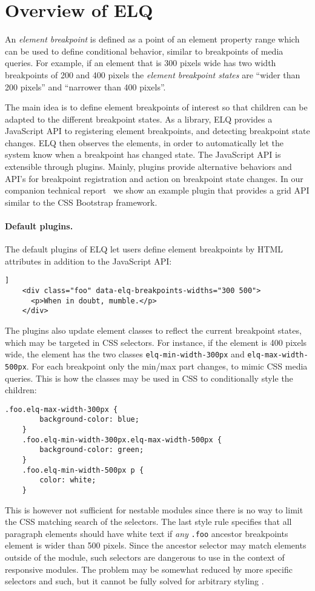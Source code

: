 \documentclass[sigconf,9pt]{acmart}
\newcommand{\elq}{ELQ}
\newcommand{\code}[1]{\texttt{#1}}
\begin{document}
\section{Overview of \elq{}}\label{sec:elq}\label{sec:elq-api}
  An \emph{element breakpoint} is defined as a point of an element
  property range which can be used to define conditional behavior,
  similar to breakpoints of media queries.  For example, if an element
  that is 300 pixels wide has two width breakpoints of 200 and 400
  pixels the {\em element breakpoint states} are ``wider than 200
  pixels'' and ``narrower than 400 pixels''.

  The main idea is to define element breakpoints of interest so that children can be adapted to the different breakpoint states.
  As a library, \elq{} provides a JavaScript API to registering element breakpoints, and detecting breakpoint state changes.
  \elq{} then observes the elements, in order to automatically let the system know when a breakpoint has changed state.
  The JavaScript API is extensible through plugins.
  Mainly, plugins provide alternative behaviors and API's for breakpoint registration and action on breakpoint state changes.
  In our companion technical report~\cite{WienerEH15} we show an example plugin that provides a grid API similar to the CSS Bootstrap framework.

  \paragraph{Default plugins.}
  The default plugins of \elq{} let users define element breakpoints by HTML attributes in addition to the JavaScript API:
  \begin{lstlisting}[gobble=4,caption={},captionpos=b,label={}]]
    <div class="foo" data-elq-breakpoints-widths="300 500">
      <p>When in doubt, mumble.</p>
    </div>
  \end{lstlisting}
  The plugins also update element classes to reflect the current breakpoint states, which may be targeted in CSS selectors.
  For instance, if the element is 400 pixels wide, the element has the two classes \code{elq-min-width-300px} and \code{elq-max-width-500px}.
  For each breakpoint only the min/max part changes, to mimic CSS media queries.
  This is how the classes may be used in CSS to conditionally style the children:
  \begin{lstlisting}[gobble=4]
    .foo.elq-max-width-300px {
        background-color: blue;
    }
    .foo.elq-min-width-300px.elq-max-width-500px {
        background-color: green;
    }
    .foo.elq-min-width-500px p {
        color: white;
    }
  \end{lstlisting}
  This is however not sufficient for nestable modules since there is no way to limit the CSS matching search of the selectors.
  The last style rule specifies that all paragraph elements should have white text if \emph{any} \code{.foo} ancestor breakpoints element is wider than 500 pixels.
  Since the ancestor selector may match elements outside of the module, such selectors are dangerous to use in the context of responsive modules.
  The problem may be somewhat reduced by more specific selectors and such, but it cannot be fully solved for arbitrary styling \cite{elq-thesis}.
\end{document}
